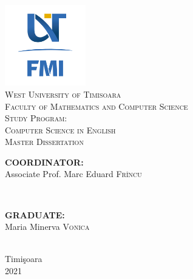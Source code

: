 \documentclass[11pt, a4paper]{report}
\begin{document}
	
	
	\begin{titlepage}
		
		\newcommand{\HRule}{\rule{\linewidth}{0.5mm}}
		
		\center
		
		\vspace{-20pt}
		\includegraphics[width=100pt]{../images/FMI-03.png}\\[1.0cm]
		
		\textsc{\LARGE West University of Timisoara}\\[0.5cm]
		\textsc{\Large Faculty of Mathematics and Computer Science}\\[0.5cm]
		\textsc{\large Study Program: \\Computer Science in English}\\[3cm]
		\textsc{\Huge Master Dissertation}\\[5cm]
		
		\begin{minipage}{0.4\textwidth}
			\begin{flushleft} \large
				\textbf{COORDINATOR:}\\
				Associate Prof. Marc Eduard \textsc{Frîncu}
			\end{flushleft}
		\end{minipage}
		~
		\begin{minipage}{0.4\textwidth}
			\begin{flushright} \large
				\textbf{GRADUATE:} \\
				Maria Minerva \textsc{Vonica}
			\end{flushright}
		\end{minipage}\\[0.5cm]
			
		\vfill
		{\large Timi\c{s}oara \\2021}\\
		\vfill
		
	\end{titlepage}
	
	
\end{document}
